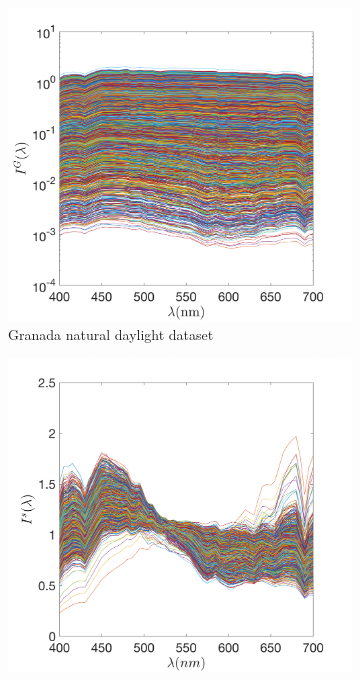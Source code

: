 \documentclass{jov}
\begin{document}
\begin{figure}
\centering
	\begin{subfigure}[b]{0.3 \textwidth}
    \centering
        \includegraphics[width=\textwidth]{../Figures/Figure6/Figure6_a.pdf}
        \caption{Granada natural daylight dataset}
        \label{fig:granadaSpectra}
    \end{subfigure}
    \begin{subfigure}[b]{0.3\textwidth}
    \centering
        \includegraphics[width=\textwidth]{../Figures/Figure6/Figure6_b.pdf}

\end{subfigure}
\end{figure}
\end{document}

